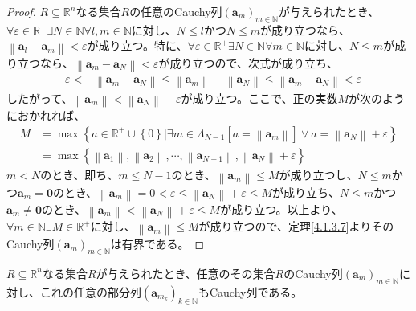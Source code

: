\documentclass[dvipdfmx]{jsarticle}
\begin{document}
\begin{proof}
$R \subseteq \mathbb{R}^{n}$なる集合$R$の任意のCauchy列$\left( \mathbf{a}_{m} \right)_{m \in \mathbb{N}}$が与えられたとき、$\forall\varepsilon \in \mathbb{R}^{+}\exists N \in \mathbb{N}\forall l,m \in \mathbb{N}$に対し、$N \leq l$かつ$N \leq m$が成り立つなら、$\left\| \mathbf{a}_{l} - \mathbf{a}_{m} \right\| < \varepsilon$が成り立つ。特に、$\forall\varepsilon \in \mathbb{R}^{+}\exists N \in \mathbb{N}\forall m \in \mathbb{N}$に対し、$N \leq m$が成り立つなら、$\left\| \mathbf{a}_{m} - \mathbf{a}_{N} \right\| < \varepsilon$が成り立つので、次式が成り立ち、
\begin{align*}
- \varepsilon < - \left\| \mathbf{a}_{m} - \mathbf{a}_{N} \right\| \leq \left\| \mathbf{a}_{m} \right\| - \left\| \mathbf{a}_{N} \right\| \leq \left\| \mathbf{a}_{m} - \mathbf{a}_{N} \right\| < \varepsilon
\end{align*}
したがって、$\left\| \mathbf{a}_{m} \right\| < \left\| \mathbf{a}_{N} \right\| + \varepsilon$が成り立つ。ここで、正の実数$M$が次のようにおかれれば、
\begin{align*}
M &= \max\left\{ a \in \mathbb{R}^{+} \cup \left\{ 0 \right\}|\exists m \in \varLambda_{N - 1}\left[ a = \left\| \mathbf{a}_{m} \right\| \right] \vee a = \left\| \mathbf{a}_{N} \right\| + \varepsilon \right\}\\
&= \max\left\{ \left\| \mathbf{a}_{1} \right\|,\left\| \mathbf{a}_{2} \right\|,\cdots,\left\| \mathbf{a}_{N - 1} \right\|,\left\| \mathbf{a}_{N} \right\| + \varepsilon \right\}
\end{align*}
$m < N$のとき、即ち、$m \leq N - 1$のとき、$\left\| \mathbf{a}_{m} \right\| \leq M$が成り立つし、$N \leq m$かつ$\mathbf{a}_{m} = \mathbf{0}$のとき、$\left\| \mathbf{a}_{m} \right\| = 0 < \varepsilon \leq \left\| \mathbf{a}_{N} \right\| + \varepsilon \leq M$が成り立ち、$N \leq m$かつ$\mathbf{a}_{m} \neq \mathbf{0}$のとき、$\left\| \mathbf{a}_{m} \right\| < \left\| \mathbf{a}_{N} \right\| + \varepsilon \leq M$が成り立つ。以上より、$\forall m \in \mathbb{N}\exists M \in \mathbb{R}^{+}$に対し、$\left\| \mathbf{a}_{m} \right\| \leq M$が成り立つので、定理\ref{4.1.3.7}よりそのCauchy列$\left( \mathbf{a}_{m} \right)_{m \in \mathbb{N}}$は有界である。
\end{proof}
\begin{thm}\label{4.1.5.3}
$R \subseteq \mathbb{R}^{n}$なる集合$R$が与えられたとき、任意のその集合$R$のCauchy列$\left( \mathbf{a}_{m} \right)_{m \in \mathbb{N}}$に対し、これの任意の部分列$\left( \mathbf{a}_{m_{k}} \right)_{k \in \mathbb{N}}$もCauchy列である。
\end{thm}
\end{document}
